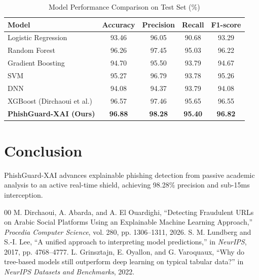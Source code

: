 \documentclass[conference]{IEEEtran}
\begin{document}
\begin{table}[htbp]
\caption{Model Performance Comparison on Test Set (\%)}
\begin{center}
\begin{tabular}{lcccc}
\toprule
\textbf{Model} & \textbf{Accuracy} & \textbf{Precision} & \textbf{Recall} & \textbf{F1-score} \\
\midrule
Logistic Regression & 93.46 & 96.05 & 90.68 & 93.29 \\
Random Forest & 96.26 & 97.45 & 95.03 & 96.22 \\
Gradient Boosting & 94.70 & 95.50 & 93.79 & 94.67 \\
SVM & 95.27 & 96.79 & 93.78 & 95.26 \\
DNN & 94.08 & 94.37 & 93.79 & 94.08 \\
XGBoost (Dirchaoui et al.) & 96.57 & 97.46 & 95.65 & 96.55 \\
\textbf{PhishGuard-XAI (Ours)} & \textbf{96.88} & \textbf{98.28} & \textbf{95.40} & \textbf{96.82} \\
\bottomrule
\end{tabular}
\label{tab:comparison}
\end{center}
\end{table}

\section{Conclusion}
PhishGuard-XAI advances explainable phishing detection from passive academic analysis to an active real-time shield, achieving 98.28\% precision and sub-15ms interception.

\begin{thebibliography}{00}
 M. Dirchaoui, A. Abarda, and A. El Ouardighi, ``Detecting Fraudulent URLs on Arabic Social Platforms Using an Explainable Machine Learning Approach,'' \emph{Procedia Computer Science}, vol. 280, pp. 1306--1311, 2026.
 S. M. Lundberg and S.-I. Lee, ``A unified approach to interpreting model predictions,'' in \emph{NeurIPS}, 2017, pp. 4768--4777.
 L. Grinsztajn, E. Oyallon, and G. Varoquaux, ``Why do tree-based models still outperform deep learning on typical tabular data?'' in \emph{NeurIPS Datasets and Benchmarks}, 2022.
\end{thebibliography}
\end{document}
